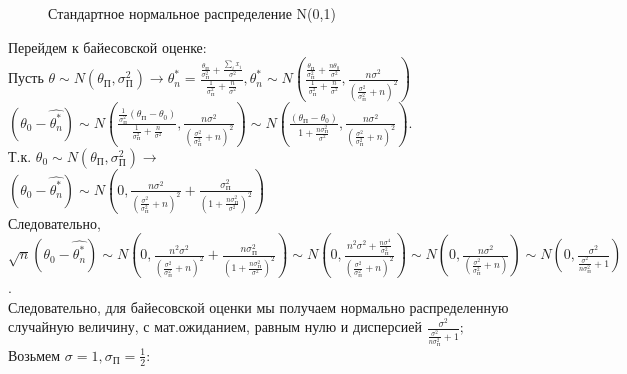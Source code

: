 \documentclass{article}
\begin{document}
\begin{figure}[h]
\caption{Стандартное нормальное распределение N(0,1)}
\label{ris:image}
\end{figure}
Перейдем к байесовской оценке:\\
Пусть $\theta \sim N(\theta_{\text{П}},\sigma_{\text{П}}^{2}) \to \theta_n^{*} = \frac{\frac{\theta_{\text{П}}}{\sigma_{\text{П}}^2} + \frac{\sum\limits_{i} x_i}{\sigma^2}}{\frac{1}{\sigma_{\text{П}}^2} + \frac{n}{\sigma^2}}, \theta_n^{*} \sim N(\frac{\frac{\theta_{\text{П}}}{\sigma_{\text{П}}^2} + \frac{n\theta_0}{\sigma^2}}{\frac{1}{\sigma_{\text{П}}^2} + \frac{n}{\sigma^2}},\frac{n\sigma^2}{(\frac{\sigma^2}{\sigma_{\text{П}}^2} + n)^2})$\\
$(\theta_0 - \hat{\theta_n^{*}}) \sim N(\frac{\frac{1}{\sigma_{\text{П}}^2}(\theta_{\text{П}} - \theta_0)}{\frac{1}{\sigma_{\text{П}}^2} + \frac{n}{\sigma^2}}, \frac{n\sigma^2}{(\frac{\sigma^2}{\sigma_{\text{П}}^2} + n)^2}) \sim N(\frac{(\theta_{\text{П}} - \theta_0)}{1 + \frac{n \sigma_{\text{П}}^2}{\sigma^2}}, \frac{n\sigma^2}{(\frac{\sigma^2}{\sigma_{\text{П}}^2} + n)^2}).$\\
Т.к. $\theta_0 \sim N(\theta_{\text{П}}, \sigma_{\text{П}}^2) \to$\\
$(\theta_0 - \hat{\theta_n^{*}}) \sim N(0, \frac{n\sigma^2}{(\frac{\sigma^2}{\sigma_{\text{П}}^2} + n)^2} + \frac{\sigma_{\text{П}}^2}{(1 + \frac{n\sigma_{\text{П}}^2}{\sigma^2})^2})$\\
Следовательно,\\
$\sqrt{n}(\theta_0 - \hat{\theta_n^{*}}) \sim N(0, \frac{n^2\sigma^2}{(\frac{\sigma^2}{\sigma_{\text{П}}^2} + n)^2} + \frac{n\sigma_{\text{П}}^2}{(1 + \frac{n\sigma_{\text{П}}^2}{\sigma^2})^2}) \sim N(0, \frac{n^2\sigma^2 + \frac{n\sigma^4}{\sigma_{\text{П}}^2}}{(\frac{\sigma^2}{\sigma_{\text{П}}^2} + n)^2}) \sim N(0, \frac{n\sigma^2}{(\frac{\sigma^2}{\sigma_{\text{П}}^2} + n)}) \sim N(0, \frac{\sigma^2}{\frac{\sigma^2}{n\sigma_{П}^2} + 1})$.\\
Следовательно, для байесовской оценки мы получаем нормально распределенную случайную величину, с мат.ожиданием, равным нулю и дисперсией $\frac{\sigma^2}{\frac{\sigma^2}{n\sigma_{\text{П}}^2} + 1};$\\
Возьмем $\sigma = 1, \sigma_{\text{П}} = \frac{1}{2}:$
\end{document}
